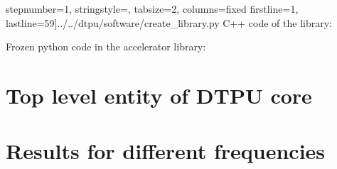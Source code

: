   stepnumber=1,                    %
  stringstyle=\color{stringColor}, %
  tabsize=2,	                   %
  columns=fixed                    %
firstline=1, lastline=59]{../../dtpu/software/create_library.py}
\newpage
C++ code of the library:

\newpage
Frozen python code in the accelerator library:


\chapter{Top level entity of DTPU core}



\chapter{Results for different frequencies}

